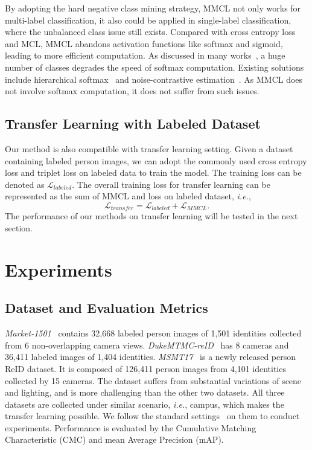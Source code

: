 \documentclass[10pt,twocolumn,letterpaper]{article}
\begin{document}
By adopting the hard negative class mining strategy, MMCL not only works for multi-label classification, it also could be applied in single-label classification, where the unbalanced class issue still exists. Compared with cross entropy loss and MCL, MMCL abandons activation functions like softmax and sigmoid, leading to more efficient computation. As discussed in many works~\cite{morin2005hierarchical, gutmann2010noise}, a huge number of classes degrades the speed of softmax computation. Existing solutions include hierarchical softmax~\cite{morin2005hierarchical} and noise-contrastive estimation~\cite{gutmann2010noise}. As MMCL does not involve softmax computation, it does not suffer from such issues.

\subsection{Transfer Learning with Labeled Dataset}\label{section:transfer}
Our method is also compatible with transfer learning setting. Given a dataset containing labeled person images, we can adopt the commonly used cross entropy loss and triplet loss on labeled data to train the model. The training loss can be denoted as $\mathcal{L}_{labeled}$. The overall training loss for transfer learning can be represented as the sum of MMCL and loss on labeled dataset, \emph{i.e.},
\begin{equation}
\mathcal {L}_{transfer} = \mathcal{L}_{labeled} + \mathcal{L}_{MMCL}.
\end{equation}
The performance of our methods on transfer learning will be tested in the next section.

\section{Experiments}
\vspace{-1mm}
\subsection{Dataset and Evaluation Metrics}
\vspace{-1mm}
\emph{Market-1501}~\cite{zheng2015scalable} contains 32,668 labeled person images of 1,501 identities collected from 6 non-overlapping camera views. \emph{DukeMTMC-reID}~\cite{ristani2016performance} has 8 cameras and 36,411 labeled images of 1,404 identities. \emph{MSMT17}~\cite{wei2018person} is a newly released person ReID dataset. It is composed of 126,411 person images from 4,101 identities collected by 15 cameras. The dataset suffers from substantial variations of scene and lighting, and is more challenging than the other two datasets. All three datasets are collected under similar scenario, \emph{i.e.}, campus, which makes the transfer learning possible. We follow the standard settings~\cite{zheng2015scalable,ristani2016performance,wei2018person} on them to conduct experiments. Performance is evaluated by the Cumulative Matching Characteristic (CMC) and mean Average Precision (mAP).
\end{document}
